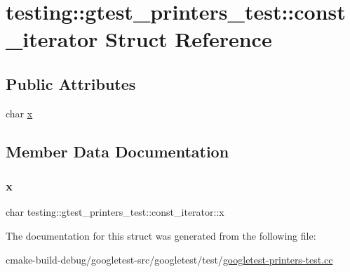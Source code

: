 \hypertarget{structtesting_1_1gtest__printers__test_1_1const__iterator}{}\section{testing\+::gtest\+\_\+printers\+\_\+test\+::const\+\_\+iterator Struct Reference}
\label{structtesting_1_1gtest__printers__test_1_1const__iterator}
\subsection*{Public Attributes}
\begin{DoxyCompactItemize}
\item 
char \mbox{\hyperlink{structtesting_1_1gtest__printers__test_1_1const__iterator_a4412dbc1c37c2bc5211971f0c8176d6b}{x}}
\end{DoxyCompactItemize}


\subsection{Member Data Documentation}
\mbox{\label{structtesting_1_1gtest__printers__test_1_1const__iterator_a4412dbc1c37c2bc5211971f0c8176d6b}} 
\subsubsection{\texorpdfstring{x}{x}}
{\footnotesize\ttfamily char testing\+::gtest\+\_\+printers\+\_\+test\+::const\+\_\+iterator\+::x}



The documentation for this struct was generated from the following file\+:\begin{DoxyCompactItemize}
\item 
cmake-\/build-\/debug/googletest-\/src/googletest/test/\mbox{\hyperlink{googletest-printers-test_8cc}{googletest-\/printers-\/test.\+cc}}\end{DoxyCompactItemize}
